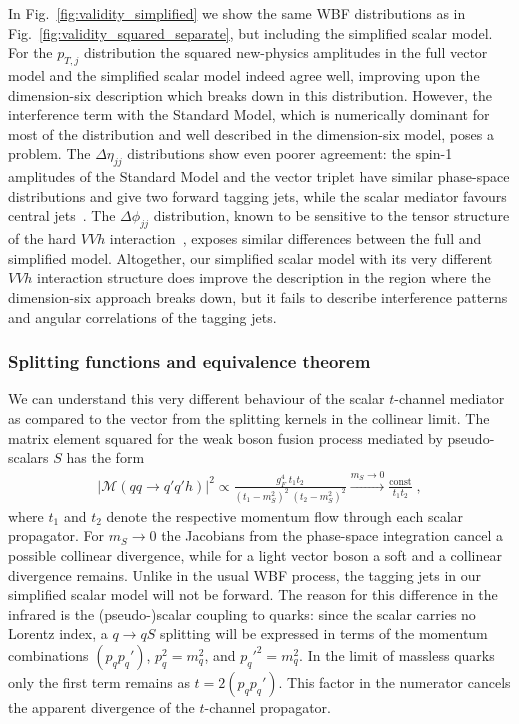 In Fig.~\ref{fig:validity_simplified} we show the same WBF distributions as in
Fig.~\ref{fig:validity_squared_separate}, but including the simplified scalar
model. For the $p_{T,j}$ distribution the squared new-physics
amplitudes in the full vector model and the simplified scalar model
indeed agree well, improving upon the dimension-six description which
breaks down in this distribution.  However, the interference term with
the Standard Model, which is numerically dominant for most of the
distribution and well described in the dimension-six model, poses a
problem.  The $\Delta \eta_{jj}$ distributions show even poorer
agreement: the spin-1 amplitudes of the Standard Model and the vector
triplet have similar phase-space distributions and give two forward
tagging jets, while the scalar mediator favours central
jets~\cite{spins2}.  The $\Delta \phi_{jj}$ distribution, known to be
sensitive to the tensor structure of the hard $VVh$
interaction~\cite{delta_phi}, exposes similar differences between the
full and simplified model.  Altogether, our simplified scalar model
with its very different $VVh$ interaction structure does improve the
description in the region where the dimension-six approach breaks down,
but it fails to describe interference patterns and angular
correlations of the tagging jets.



\subsubsection*{Splitting functions and equivalence theorem}

We can understand this very different behaviour of the scalar
$t$-channel mediator as compared to the vector from the splitting
kernels in the collinear limit.  The matrix element squared for the
weak boson fusion process mediated by pseudo-scalars $S$ has the form
%
\begin{align}
 | \mathcal{M}(qq \to q'q'h) |^2 \propto 
  \frac{g_F^4 \;  t_1 t_2}{(t_1 - m_S^2)^2 \; (t_2 - m_S^2)^2} 
\stackrel{m_S \to 0}{\longrightarrow} \frac{\text{const}}{t_1 t_2} \; ,
\end{align}
%
where $t_1$ and $t_2$ denote the respective momentum flow through each
scalar propagator. For $m_S \to 0$ the Jacobians from the phase-space
integration cancel a possible collinear divergence, while for a light
vector boson a soft and a collinear divergence remains. Unlike in the
usual WBF process, the tagging jets in our simplified scalar model
will not be forward.  The reason for this difference in the
infrared is the (pseudo-)scalar coupling to quarks: since the scalar
carries no Lorentz index, a $q \to q S$ splitting will be expressed in
terms of the momentum combinations $(p_q p_q')$, $p_q^2 = m_q^2$, and
$p_q'^2 = m_q^2$. In the limit of massless quarks only the first term
remains as $t = 2 (p_q p_q')$.  This factor in the numerator cancels
the apparent divergence of the $t$-channel propagator.

